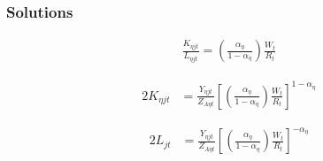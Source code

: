 \documentclass[
	12pt,
	]{article}
\numberwithin{equation}{section}
\theoremstyle{definition}
\theoremstyle{plain}
\theoremstyle{plain}
\theoremstyle{plain}
\begin{document}
\subsubsection*{Solutions}

\begin{align}
	\frac{K_{\eta jt}}{L_{\eta jt}} = \left( \frac{\alpha_\eta}{1-{\alpha_\eta}} \right) \frac{W_t}{R_t} \label{eq:int-good-firm-TMRS}
\end{align}


\begin{alignat}{2}
	K_{\eta jt} & = \frac{Y_{\eta jt}}{Z_{A\eta t}} \left[ \left( \frac{\alpha_\eta}{1-{\alpha_\eta}} \right) \frac{W_t}{R_t}\right]^{1-{\alpha_\eta}} \label{eq:int-good-firm-Kt-demand}
\end{alignat}

%
\begin{alignat}{2}
	L_{jt} & = \frac{Y_{\eta jt}}{Z_{A\eta t}} \left[ \left( \frac{\alpha_\eta}{1-{\alpha_\eta}} \right) \frac{W_t}{R_t}\right]^{-{\alpha_\eta}} \label{eq:int-good-firm-Lt-demand}
\end{alignat}
\end{document}
